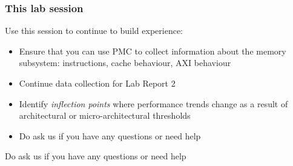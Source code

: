 \begin{frame}
  \frametitle{This lab session}

  Use this session to continue to build experience:
  \begin{itemize}
    \item Ensure that you can use PMC to collect information about the memory
      subsystem: instructions, cache behaviour, AXI behaviour
    \item Continue data collection for Lab Report 2
    \item Identify \textit{inflection points} where performance trends change
      as a result of architectural or micro-architectural thresholds
    \item Do ask us if you have any questions or need help
  \end{itemize}
  Do ask us if you have any questions or need help
\end{frame}


